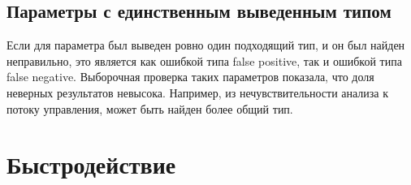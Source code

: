 
\subsection{Параметры с единственным выведенным типом}
\label{sub:single-type-parameters}

Если для параметра был выведен ровно один подходящий тип, и он был найден
неправильно, это является как ошибкой типа false positive, так и ошибкой типа
false negative. Выборочная проверка таких параметров показала, что доля неверных
результатов невысока. Например, из нечувствительности анализа к потоку
управления, может быть найден более общий тип.

\section{Быстродействие}
\label{sec:inference-performance}
